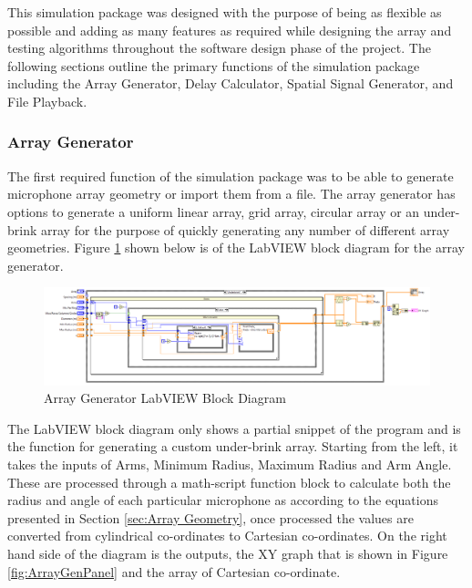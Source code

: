 \documentclass{UoNMCHA}
\numberwithin{equation}{section}
\begin{document}
    This simulation package was designed with the purpose of being as flexible as possible and adding as many features as required while designing the array and testing algorithms throughout the software design phase of the project. The following sections outline the primary functions of the simulation package including the Array Generator, Delay Calculator, Spatial Signal Generator, and File Playback.
\subsubsection{Array Generator} \label{sec:Array Generator}
    The first required function of the simulation package was to be able to generate microphone array geometry or import them from a file. The array generator has options to generate a uniform linear array, grid array, circular array or an under-brink array for the purpose of quickly generating any number of different array geometries. Figure \ref{fig:ArrayGenBlock} shown below is of the LabVIEW block diagram for the array generator.
    
    \begin{figure}[H]
        \centering
        \includegraphics[keepaspectratio, width = \textwidth]{Figures/ArrayGenBlock.png}
        \caption{Array Generator LabVIEW Block Diagram}
        \label{fig:ArrayGenBlock}
    \end{figure}
    
    The LabVIEW block diagram only shows a partial snippet of the program and is the function for generating a custom under-brink array. Starting from the left, it takes the inputs of Arms, Minimum Radius, Maximum Radius and Arm Angle. These are processed through a math-script function block to calculate both the radius and angle of each particular microphone as according to the equations presented in Section \ref{sec:Array Geometry}, once processed the values are converted from cylindrical co-ordinates to Cartesian co-ordinates. On the right hand side of the diagram is the outputs, the XY graph that is shown in Figure \ref{fig:ArrayGenPanel} and the array of Cartesian co-ordinate.
    
\end{document}
